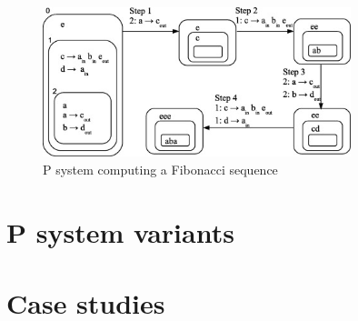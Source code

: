 








\begin{figure}[ht]
  \centering
  \includegraphics[width=0.8\textwidth]{img/p_system_fibonacci.jpg}
  \caption{P system computing a Fibonacci sequence \cite{Buiu201233PSystemFibonacci}}
  \label{fig:p_system_fibonacci}
\end{figure}




\section{P system variants} %
\label{sec:p_system_variants}



\section{Case studies} %
\label{sec:case_studies}



